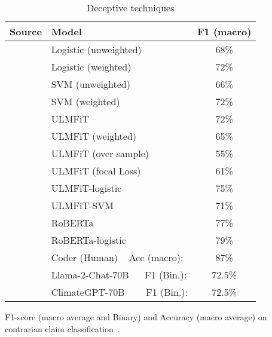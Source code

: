 \begin{table*}[ht]
\begin{subtable}[t]{0.54\textwidth}
{        \begin{tabular}{llc}
    \toprule
    \textbf{Source} & \textbf{Model} & \textbf{F1 (macro)} \\
    \midrule
    \citet{coanComputerassistedClassificationContrarian2021} & Logistic (unweighted) &  68\% \\
    \citet{coanComputerassistedClassificationContrarian2021} & Logistic (weighted) &  72\% \\
    \citet{coanComputerassistedClassificationContrarian2021} & SVM (unweighted) & 66\% \\
    \citet{coanComputerassistedClassificationContrarian2021} & SVM (weighted) &  72\% \\
    \citet{coanComputerassistedClassificationContrarian2021} & ULMFiT & 72\% \\
    \citet{coanComputerassistedClassificationContrarian2021} & ULMFiT (weighted) & 65\% \\
    \citet{coanComputerassistedClassificationContrarian2021} & ULMFiT (over sample) &  55\% \\
    \citet{coanComputerassistedClassificationContrarian2021} & ULMFiT (focal Loss) &  61\% \\
    \citet{coanComputerassistedClassificationContrarian2021} & ULMFiT-logistic &  75\% \\
    \citet{coanComputerassistedClassificationContrarian2021} & ULMFiT-SVM & 71\% \\
    \citet{coanComputerassistedClassificationContrarian2021} & RoBERTa &  77\% \\
    \citet{coanComputerassistedClassificationContrarian2021} & RoBERTa-logistic & 79\% \\    
    \citet{coanComputerassistedClassificationContrarian2021} & Coder (Human) \textcolor{white}{bl}Acc (macro):&  87\% \\
    \citet{thulke2024climategpt} & Llama-2-Chat-70B\textcolor{white}{bla} F1 (Bin.):& 72.5\% \\
    \citet{thulke2024climategpt} & ClimateGPT-70B\textcolor{white}{blah} F1 (Bin.):& 72.5\% \\
    \bottomrule
    \end{tabular}
    }
    \caption{F1-score (macro average and Binary) and Accuracy (macro average) on contrarian claim classification~\cite{coanComputerassistedClassificationContrarian2021}.}
    \label{tab:perf_contrarian_claim}
    \end{subtable}
    \caption{Deceptive techniques}
    \label{app:table deceptive techniques}
\end{table*}

